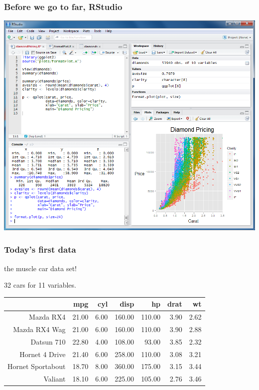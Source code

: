\documentclass{beamer}\usepackage{graphicx, color}
\begin{document}
\begin{frame}
  \frametitle{Before we go to far, RStudio}
  \includegraphics[height = 0.8\textheight, keepaspectratio = true]{figure/rstudio}

\end{frame}

\begin{frame}
  \frametitle{Today's first data}

  the muscle car data set!

  32 cars for 11 variables.

\begin{table}[ht]
\begin{center}
\begin{tabular}{rrrrrrr}
  \hline
 & mpg & cyl & disp & hp & drat & wt \\ 
  \hline
Mazda RX4 & 21.00 & 6.00 & 160.00 & 110.00 & 3.90 & 2.62 \\ 
  Mazda RX4 Wag & 21.00 & 6.00 & 160.00 & 110.00 & 3.90 & 2.88 \\ 
  Datsun 710 & 22.80 & 4.00 & 108.00 & 93.00 & 3.85 & 2.32 \\ 
  Hornet 4 Drive & 21.40 & 6.00 & 258.00 & 110.00 & 3.08 & 3.21 \\ 
  Hornet Sportabout & 18.70 & 8.00 & 360.00 & 175.00 & 3.15 & 3.44 \\ 
  Valiant & 18.10 & 6.00 & 225.00 & 105.00 & 2.76 & 3.46 \\ 
   \hline
\end{tabular}
\end{center}
\end{table}



\end{frame}
\end{document}
